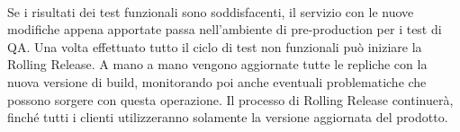 \paragraph{}
Se i risultati dei test funzionali sono soddisfacenti, il servizio con le nuove modifiche appena apportate passa nell'ambiente di pre-production per i test di QA. Una volta effettuato tutto il ciclo di test non funzionali può iniziare la Rolling Release. A mano a mano vengono aggiornate tutte le repliche con la nuova versione di build, monitorando poi anche eventuali problematiche che possono sorgere con questa operazione. Il processo di Rolling Release continuerà,  finché tutti i clienti utilizzeranno solamente la versione aggiornata del prodotto.


